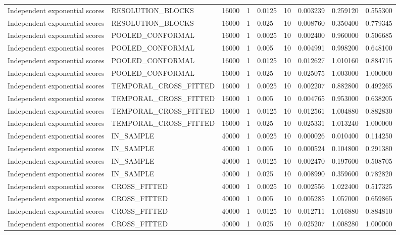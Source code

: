 \begin{tabular}{lllllllll}
Independent exponential scores & RESOLUTION\_BLOCKS & 16000 & 1 & 0.0125 & 10 & 0.003239 & 0.259120 & 0.555300 \\
Independent exponential scores & RESOLUTION\_BLOCKS & 16000 & 1 & 0.025 & 10 & 0.008760 & 0.350400 & 0.779345 \\
Independent exponential scores & POOLED\_CONFORMAL & 16000 & 1 & 0.0025 & 10 & 0.002400 & 0.960000 & 0.506685 \\
Independent exponential scores & POOLED\_CONFORMAL & 16000 & 1 & 0.005 & 10 & 0.004991 & 0.998200 & 0.648100 \\
Independent exponential scores & POOLED\_CONFORMAL & 16000 & 1 & 0.0125 & 10 & 0.012627 & 1.010160 & 0.884715 \\
Independent exponential scores & POOLED\_CONFORMAL & 16000 & 1 & 0.025 & 10 & 0.025075 & 1.003000 & 1.000000 \\
Independent exponential scores & TEMPORAL\_CROSS\_FITTED & 16000 & 1 & 0.0025 & 10 & 0.002207 & 0.882800 & 0.492265 \\
Independent exponential scores & TEMPORAL\_CROSS\_FITTED & 16000 & 1 & 0.005 & 10 & 0.004765 & 0.953000 & 0.638205 \\
Independent exponential scores & TEMPORAL\_CROSS\_FITTED & 16000 & 1 & 0.0125 & 10 & 0.012561 & 1.004880 & 0.882830 \\
Independent exponential scores & TEMPORAL\_CROSS\_FITTED & 16000 & 1 & 0.025 & 10 & 0.025331 & 1.013240 & 1.000000 \\
Independent exponential scores & IN\_SAMPLE & 40000 & 1 & 0.0025 & 10 & 0.000026 & 0.010400 & 0.114250 \\
Independent exponential scores & IN\_SAMPLE & 40000 & 1 & 0.005 & 10 & 0.000524 & 0.104800 & 0.291380 \\
Independent exponential scores & IN\_SAMPLE & 40000 & 1 & 0.0125 & 10 & 0.002470 & 0.197600 & 0.508705 \\
Independent exponential scores & IN\_SAMPLE & 40000 & 1 & 0.025 & 10 & 0.008990 & 0.359600 & 0.782820 \\
Independent exponential scores & CROSS\_FITTED & 40000 & 1 & 0.0025 & 10 & 0.002556 & 1.022400 & 0.517325 \\
Independent exponential scores & CROSS\_FITTED & 40000 & 1 & 0.005 & 10 & 0.005285 & 1.057000 & 0.659865 \\
Independent exponential scores & CROSS\_FITTED & 40000 & 1 & 0.0125 & 10 & 0.012711 & 1.016880 & 0.884810 \\
Independent exponential scores & CROSS\_FITTED & 40000 & 1 & 0.025 & 10 & 0.025207 & 1.008280 & 1.000000 \\

\end{tabular}
